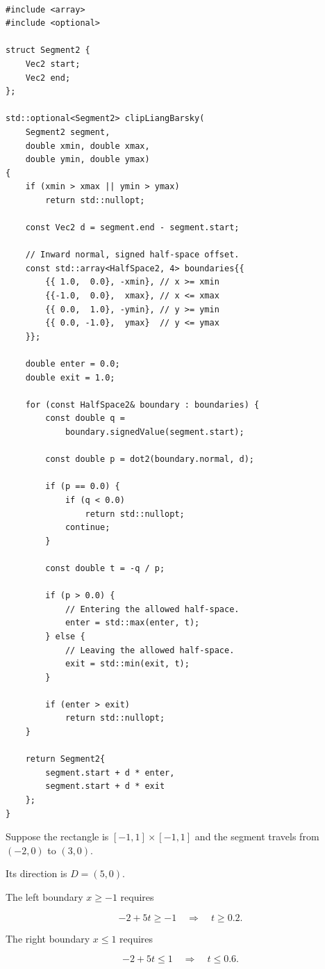 \begin{verbatim}

#include <array>
#include <optional>

struct Segment2 {
    Vec2 start;
    Vec2 end;
};

std::optional<Segment2> clipLiangBarsky(
    Segment2 segment,
    double xmin, double xmax,
    double ymin, double ymax)
{
    if (xmin > xmax || ymin > ymax)
        return std::nullopt;

    const Vec2 d = segment.end - segment.start;

    // Inward normal, signed half-space offset.
    const std::array<HalfSpace2, 4> boundaries{{
        {{ 1.0,  0.0}, -xmin}, // x >= xmin
        {{-1.0,  0.0},  xmax}, // x <= xmax
        {{ 0.0,  1.0}, -ymin}, // y >= ymin
        {{ 0.0, -1.0},  ymax}  // y <= ymax
    }};

    double enter = 0.0;
    double exit = 1.0;

    for (const HalfSpace2& boundary : boundaries) {
        const double q =
            boundary.signedValue(segment.start);

        const double p = dot2(boundary.normal, d);

        if (p == 0.0) {
            if (q < 0.0)
                return std::nullopt;
            continue;
        }

        const double t = -q / p;

        if (p > 0.0) {
            // Entering the allowed half-space.
            enter = std::max(enter, t);
        } else {
            // Leaving the allowed half-space.
            exit = std::min(exit, t);
        }

        if (enter > exit)
            return std::nullopt;
    }

    return Segment2{
        segment.start + d * enter,
        segment.start + d * exit
    };
}
\end{verbatim}

Suppose the rectangle is \([-1,1]\times[-1,1]\) and the segment travels from \((-2,0)\) to \((3,0)\).

Its direction is \(D=(5,0)\).

The left boundary \(x\ge-1\) requires

\[
-2+5t\ge-1 \quad\Longrightarrow\quad t\ge0.2.
\]

The right boundary \(x\le1\) requires

\[
-2+5t\le1 \quad\Longrightarrow\quad t\le0.6.
\]


